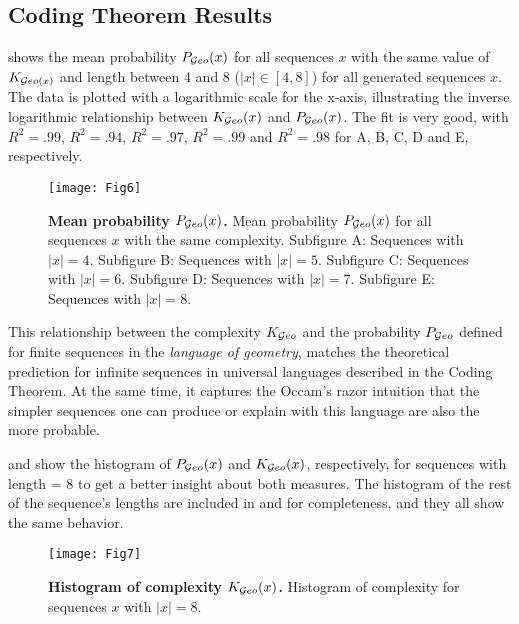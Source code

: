 \subsection{Coding Theorem Results}

 shows the mean probability $P_{\mathcal Geo}(x)$ for all sequences $x$ with the same value of $K_{\mathcal Geo(x)}$ and length between 4 and 8 ($|x| \in \left[4,8 \right]$) for all generated sequences $x$. The data is plotted with a logarithmic scale for the x-axis, illustrating the inverse logarithmic relationship between $K_{\mathcal Geo}(x)$ and $P_{\mathcal Geo}(x)$. The fit is very good, with $R^2=.99$, $R^2=.94$, $R^2=.97$, $R^2=.99$ and $R^2=.98$ for A, B, C, D and E, respectively.

\begin{figure}[!ht]
    \centering
    \texttt{[image: Fig6]}
    \caption{{\bf Mean probability $P_{\mathcal Geo}(x)$.} Mean probability $P_{\mathcal Geo}(x)$ for all sequences $x$ with the same complexity.
    Subfigure A: Sequences with $|x| = 4$.
    Subfigure B: Sequences with $|x| = 5$.
    Subfigure C: Sequences with $|x| = 6$.
    Subfigure D: Sequences with $|x| = 7$.
    Subfigure E: Sequences with $|x| = 8$.}
    \label{fig:codR}
\end{figure}

This relationship between the complexity $K_{\mathcal Geo}$ and the probability $P_{\mathcal Geo}$ defined for finite sequences in the \textit{language of geometry}, matches the theoretical prediction for infinite sequences in universal languages described in the Coding Theorem. At the same time, it captures the Occam's razor intuition that the simpler sequences one can produce or explain with this language are also the more probable.

 and  show the histogram of $P_{\mathcal Geo}(x)$ and $K_{\mathcal Geo}(x)$, respectively, for sequences with length = 8 to get a better insight about both measures. The histogram of the rest of the sequence's lengths are included in  and  for completeness, and they all show the same behavior.

\begin{figure}[!ht]
    \centering
    \texttt{[image: Fig7]}
    \caption{{\bf Histogram of complexity $K_{\mathcal Geo}(x)$.} Histogram of complexity for sequences $x$ with $|x| = 8$.}
    \label{fig:codK:8}
\end{figure}


